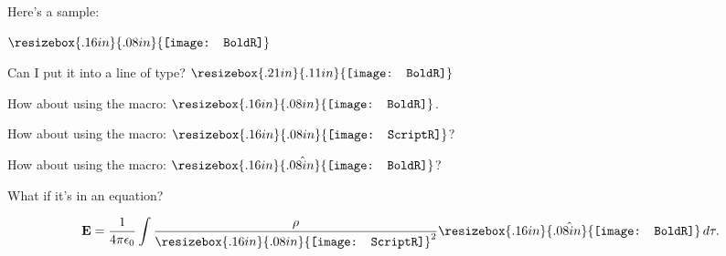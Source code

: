 \documentclass{report}
\def\rcurs{{\mbox{$\resizebox{.16in}{.08in}{\texttt{[image: ScriptR]}}$}}}
\def\brcurs{{\mbox{$\resizebox{.16in}{.08in}{\texttt{[image: BoldR]}}$}}}
\def\hrcurs{{\mbox{$\hat \brcurs$}}}
\begin{document}
Here's a sample:

$\resizebox{.16in}{.08in}{\texttt{[image: BoldR]}}$

Can I put it into a line of type?  $\resizebox{.21in}{.11in}{\texttt{[image: BoldR]}}$

How about using the macro: \brcurs.

How about using the macro: \rcurs?

How about using the macro: \hrcurs?

What if it's in an equation?

\begin{equation}
{\bf E} = {1\over 4\pi\epsilon_0}\int {\rho\over \rcurs^2}{\hrcurs}\,d\tau.
\end{equation}
\end{document}
